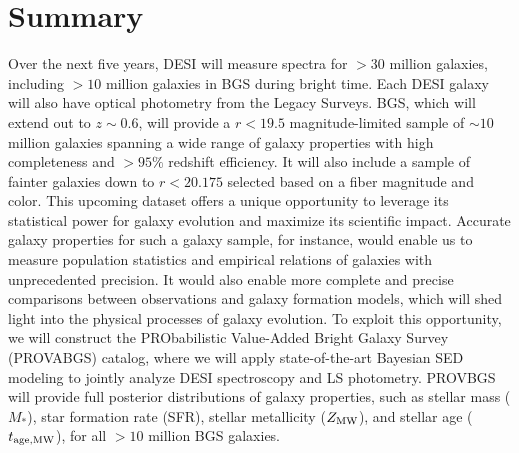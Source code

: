 \section{Summary}
Over the next five years, DESI will measure spectra for ${>}30$ million
galaxies, including ${>}10$ million galaxies in BGS during bright time.
Each DESI galaxy will also have optical photometry from the Legacy Surveys. 
BGS, which will extend out to $z\sim0.6$, will provide a $r < 19.5$
magnitude-limited sample of ${\sim}10$ million galaxies spanning a wide range
of galaxy properties with high completeness and ${>}95\%$ redshift efficiency.
It will also include a sample of fainter galaxies down to $r < 20.175$ selected
based on a fiber magnitude and color. 
This upcoming dataset offers a unique opportunity to leverage its statistical
power for galaxy evolution and maximize its scientific impact. 
Accurate galaxy properties for such a galaxy sample, for instance,  would
enable us to measure population statistics and empirical relations of galaxies
with unprecedented precision. 
It would also enable more complete and precise comparisons between observations
and galaxy formation models, which will shed light into the physical processes
of galaxy evolution.
To exploit this opportunity, we will construct the PRObabilistic Value-Added
Bright Galaxy Survey (PROVABGS) catalog, where we will apply state-of-the-art
Bayesian SED modeling to jointly analyze DESI spectroscopy and LS photometry. 
PROVBGS will provide full posterior distributions of galaxy properties, such as
stellar mass ($M_*$), star formation rate (SFR), stellar metallicity 
($Z_{\rm MW}$), and stellar age ($t_{\rm age, MW}$), for all ${>}10$ million BGS galaxies.

